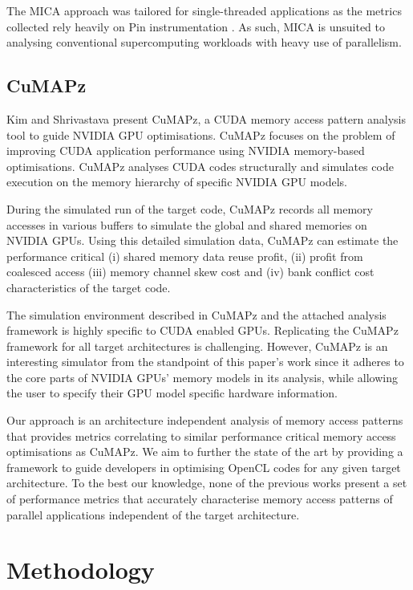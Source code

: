 \documentclass[review=false, sigchi]{acmart}
\begin{document}
	The MICA approach was tailored for single-threaded applications as the metrics collected rely heavily on Pin instrumentation \cite{luk2005pin}. As such, MICA is unsuited to analysing conventional supercomputing workloads with heavy use of parallelism.

	\subsection{CuMAPz}
	
	Kim and Shrivastava \cite{kim2011cumapz} present CuMAPz, a CUDA memory access pattern analysis tool to guide NVIDIA GPU optimisations. CuMAPz focuses on the problem of improving CUDA application performance using NVIDIA memory-based optimisations. CuMAPz analyses CUDA codes structurally and simulates code execution on the memory hierarchy of specific NVIDIA GPU models.
	
	During the simulated run of the target code, CuMAPz records all memory accesses in various buffers to simulate the global and shared memories on NVIDIA GPUs. Using this detailed simulation data, CuMAPz can estimate the performance critical (i) shared memory data reuse profit, (ii) profit from coalesced access (iii) memory channel skew cost and (iv) bank conflict cost characteristics of the target code.
	
	The simulation environment described in CuMAPz and the attached analysis framework is highly specific to CUDA enabled GPUs. Replicating the CuMAPz framework for all target architectures is challenging. However, CuMAPz is an interesting simulator from the standpoint of this paper's work since it adheres to the core parts of NVIDIA GPUs' memory models in its analysis, while allowing the user to specify their GPU model specific hardware information.
	
	Our approach is an architecture independent analysis of memory access patterns that provides metrics correlating to similar performance critical memory access optimisations as CuMAPz. We aim to further the state of the art by providing a framework to guide developers in optimising OpenCL codes for any given target architecture. To the best our knowledge, none of the previous works present a set of performance metrics that accurately characterise memory access patterns of parallel applications independent of the target architecture.
	
	\section{Methodology} \label{method}
	
\end{document}
